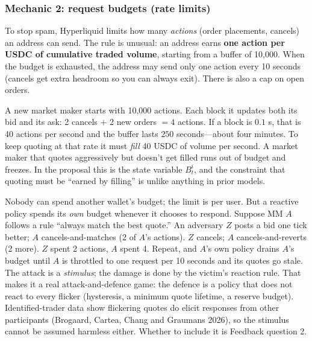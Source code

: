 \documentclass[11pt]{article}
\begin{document}
\subsubsection{Mechanic 2: request budgets (rate limits)}\label{sec:ratelimit}
To stop spam, Hyperliquid limits how many \emph{actions} (order placements, cancels) an address can send. The rule is unusual: an address earns \textbf{one action per USDC of cumulative traded volume}, starting from a buffer of 10{,}000. When the budget is exhausted, the address may send only one action every 10 seconds (cancels get extra headroom so you can always exit). There is also a cap on open orders.

\begin{example}
A new market maker starts with 10{,}000 actions. Each block it updates both its bid and its ask: 2 cancels $+$ 2 new orders $=4$ actions. If a block is $0.1$ s, that is 40 actions per second and the buffer lasts $250$ seconds---about four minutes. To keep quoting at that rate it must \emph{fill} 40 USDC of volume per second. A market maker that quotes aggressively but doesn't get filled runs out of budget and freezes. In the proposal this is the state variable $B^i_t$, and the constraint that quoting must be ``earned by filling'' is unlike anything in prior models.
\end{example}

\begin{example}
Nobody can spend another wallet's budget; the limit is per user. But a reactive policy spends its \emph{own} budget whenever it chooses to respond. Suppose MM $A$ follows a rule ``always match the best quote.'' An adversary $Z$ posts a bid one tick better; $A$ cancels-and-matches (2 of $A$'s actions). $Z$ cancels; $A$ cancels-and-reverts (2 more). $Z$ spent 2 actions, $A$ spent 4. Repeat, and $A$'s own policy drains $A$'s budget until $A$ is throttled to one request per 10 seconds and its quotes go stale. The attack is a \emph{stimulus}; the damage is done by the victim's reaction rule. That makes it a real attack-and-defence game: the defence is a policy that does not react to every flicker (hysteresis, a minimum quote lifetime, a reserve budget). Identified-trader data show flickering quotes do elicit responses from other participants (Brogaard, Cartea, Chang and Graumans 2026), so the stimulus cannot be assumed harmless either. Whether to include it is Feedback question 2.
\end{example}
\end{document}
